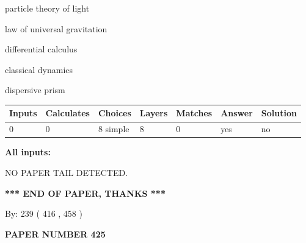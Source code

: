 \documentclass[12pt]{article}
\begin{document}
 
particle theory of light
 
 
law of universal gravitation
 
 
differential calculus
 
 
classical dynamics
 
 
dispersive prism
 
 
\noindent{}
 
 
   
   
   
   
\noindent\begin{tabular}{|l|l|l|l|l|l|l|}
 \hline
Inputs & Calculates & Choices & Layers & Matches & Answer & Solution \\ \hline
 0  & 
 0  & 
 8
  simple  
  & 
 8  & 
 0  & 
  yes & 
  no 
  \\ \hline
 \end{tabular}
   
   
   
   
\noindent{}
   
   
   
   
\noindent\vspace{0.1in}\hspace{-0.08in} {\textbf{\Large{All inputs: }}}
   
   
   
   
\vspace{2.0in} NO PAPER TAIL DETECTED.
   
   
   
   
\vspace{1.0in} 
{\textbf{\large{ *** END OF PAPER, THANKS *** }}} 
   
   
\hspace{1.0in} By: 
 239 ( 416 ,  458 )
   
   
   
   
\newpage 
\setcounter{page}{ 
   425001 } 
   
   
   
   
 {\textbf{ \Large{ PAPER NUMBER  425  }}}
   
   
\vspace{0.2in}
   
   
   
\end{document}
